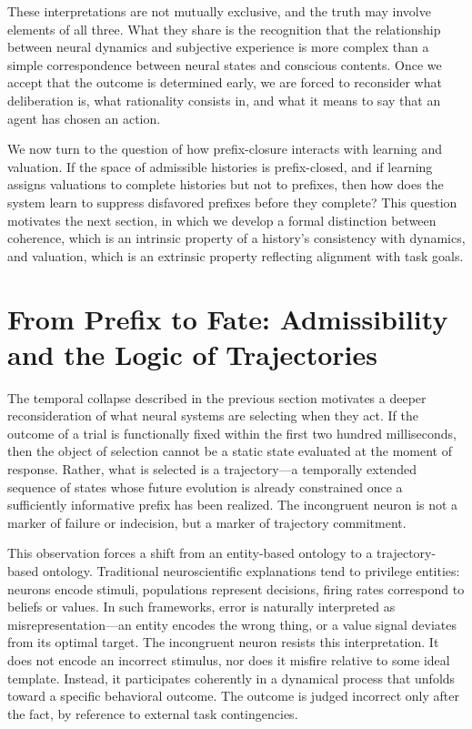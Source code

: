 \documentclass[11pt]{article}
\begin{document}
These interpretations are not mutually exclusive, and the truth may involve elements of all three. What they share is the recognition that the relationship between neural dynamics and subjective experience is more complex than a simple correspondence between neural states and conscious contents. Once we accept that the outcome is determined early, we are forced to reconsider what deliberation is, what rationality consists in, and what it means to say that an agent has chosen an action.

We now turn to the question of how prefix-closure interacts with learning and valuation. If the space of admissible histories is prefix-closed, and if learning assigns valuations to complete histories but not to prefixes, then how does the system learn to suppress disfavored prefixes before they complete? This question motivates the next section, in which we develop a formal distinction between coherence, which is an intrinsic property of a history's consistency with dynamics, and valuation, which is an extrinsic property reflecting alignment with task goals.

\section{From Prefix to Fate: Admissibility and the Logic of Trajectories}

The temporal collapse described in the previous section motivates a deeper reconsideration of what neural systems are selecting when they act. If the outcome of a trial is functionally fixed within the first two hundred milliseconds, then the object of selection cannot be a static state evaluated at the moment of response. Rather, what is selected is a trajectory—a temporally extended sequence of states whose future evolution is already constrained once a sufficiently informative prefix has been realized. The incongruent neuron is not a marker of failure or indecision, but a marker of trajectory commitment.

This observation forces a shift from an entity-based ontology to a trajectory-based ontology. Traditional neuroscientific explanations tend to privilege entities: neurons encode stimuli, populations represent decisions, firing rates correspond to beliefs or values. In such frameworks, error is naturally interpreted as misrepresentation—an entity encodes the wrong thing, or a value signal deviates from its optimal target. The incongruent neuron resists this interpretation. It does not encode an incorrect stimulus, nor does it misfire relative to some ideal template. Instead, it participates coherently in a dynamical process that unfolds toward a specific behavioral outcome. The outcome is judged incorrect only after the fact, by reference to external task contingencies.
\end{document}
